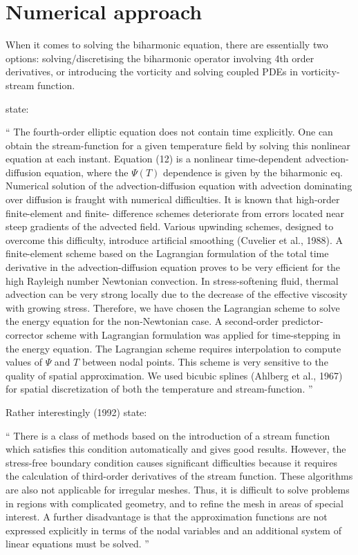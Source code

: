 \section{Numerical approach}

When it comes to solving the biharmonic equation, there are essentially two options:
solving/discretising the biharmonic operator involving 4th order derivatives, 
or introducing the vorticity and solving coupled PDEs in vorticity-stream function.

\textcite{mayu92} state: 
\begin{displayquote}
{\color{darkgray}
`` The fourth-order elliptic equation does not contain time explicitly. One can
obtain the stream-function for a given temperature field by solving this nonlinear
equation at each instant. Equation (12) is a nonlinear time-dependent advection-
diffusion equation, where the $\Psi(T)$ dependence is given by the biharmonic eq. Numerical solution
of the advection-diffusion equation with advection dominating over diffusion is fraught
with numerical difficulties. It is known that high-order finite-element and finite-
difference schemes deteriorate from errors located near steep gradients of the advected
field. Various upwinding schemes, designed to overcome this difficulty, introduce
artificial smoothing (Cuvelier et al., 1988). A finite-element scheme based on the
Lagrangian formulation of the total time derivative in the advection-diffusion equation
\cite{mayu91} proves to be very efficient for the high Rayleigh number
Newtonian convection. In stress-softening fluid, thermal advection can be very strong
locally due to the decrease of the effective viscosity with growing stress. Therefore,
we have chosen the Lagrangian scheme to solve the energy equation for the
non-Newtonian case. A second-order predictor-corrector scheme with Lagrangian
formulation was applied for time-stepping in the energy equation. The Lagrangian scheme requires
interpolation to compute values of $\Psi$ and $T$ between nodal points. This scheme is
very sensitive to the quality of spatial approximation. We used bicubic splines (Ahlberg
et al., 1967) for spatial discretization of both the temperature and stream-function.
''}
\end{displayquote}

\noindent Rather interestingly \textcite{popo92} (1992) state: 
\begin{displayquote}
{\color{darkgray}
``
There is a class of methods based on the introduction of a
stream function which satisfies this condition automatically
and gives good results. However, the stress-free boundary
condition causes significant difficulties because it requires
the calculation of third-order derivatives of the stream
function. These algorithms are also not applicable for
irregular meshes. Thus, it is difficult to solve problems in
regions with complicated geometry, and to refine the mesh
in areas of special interest. A further disadvantage is that
the approximation functions are not expressed explicitly in
terms of the nodal variables and an additional system of
linear equations must be solved.
'' }
\end{displayquote}

